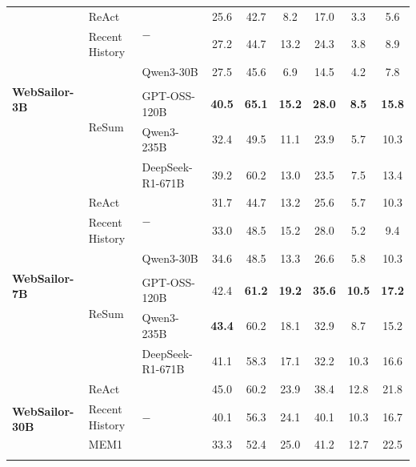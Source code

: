\begin{table}[!t]
{\begin{tabular}{lll|cc|cc|cc}
        
        \multirow{7}{*}{\textbf{WebSailor-3B}} & ReAct & \multirow{2}{*}{$-$} & 25.6 & 42.7 & 8.2 & 17.0 & 3.3 & 5.6 \\ 
        & Recent History & & 27.2 & 44.7 & 13.2 & 24.3 & 3.8 & 8.9 \\ \cmidrule{2-9} 
        &  \multirow{5}{*}{ReSum} & Qwen3-30B & 27.5 & 45.6 & 6.9 & 14.5 & 4.2 & 7.8 \\
        & & \cellcolor{ours}{ReSumTool-30B} & \cellcolor{ours}{35.3} & \cellcolor{ours}{52.4} & \cellcolor{ours}{13.7} & \cellcolor{ours}{24.6} & \cellcolor{ours}{6.8} & \cellcolor{ours}{10.8} \\ 
        & & GPT-OSS-120B & \textbf{40.5} & \textbf{65.1} & \textbf{15.2} & \textbf{28.0} & \textbf{8.5} & \textbf{15.8} \\ 
        & & Qwen3-235B  & 32.4 & 49.5 & 11.1 & 23.9 & 5.7 & 10.3 \\ 
        & & DeepSeek-R1-671B  & 39.2 & 60.2 & 13.0 & 23.5 & 7.5 & 13.4 \\ \midrule
        
        \multirow{7}{*}{\textbf{WebSailor-7B}} & ReAct & \multirow{2}{*}{$-$} & 31.7 & 44.7 & 13.2 & 25.6 & 5.7 & 10.3 \\ 
        & Recent History & & 33.0 & 48.5 & 15.2 & 28.0 & 5.2 & 9.4 \\ \cmidrule{2-9}
        & \multirow{5}{*}{ReSum} & Qwen3-30B & 34.6 & 48.5 & 13.3 & 26.6 & 5.8 & 10.3 \\ 
        & & \cellcolor{ours}{ReSumTool-30B} & \cellcolor{ours}{40.5} & \cellcolor{ours}{60.2} & \cellcolor{ours}{17.2} & \cellcolor{ours}{30.8} & \cellcolor{ours}{9.0} & \cellcolor{ours}{15.2} \\ 
        & & GPT-OSS-120B & 42.4 & \textbf{61.2} & \textbf{19.2} & \textbf{35.6} & \textbf{10.5} & \textbf{17.2} \\ 
        & & Qwen3-235B & \textbf{43.4} & 60.2 & 18.1 & 32.9 & 8.7 & 15.2 \\
        & & DeepSeek-R1-671B & 41.1 & 58.3 & 17.1 & 32.2 & 10.3 & 16.6 \\ \midrule 

        \multirow{8}{*}{\textbf{WebSailor-30B}} & ReAct & \multirow{3}{*}{$-$} & 45.0 & 60.2 & 23.9 & 38.4 & 12.8 & 21.8 \\ 
        & Recent History & & 40.1 & 56.3 & 24.1 & 40.1 & 10.3 & 16.7 \\ 
        & MEM1 & & 33.3 & 52.4 & 25.0 & 41.2 & 12.7 & 22.5  \\ \cmidrule{2-9}  
        

\end{tabular}}
\end{table}
